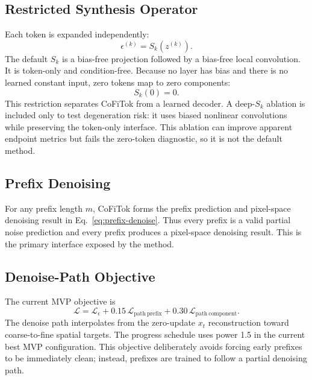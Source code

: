 \documentclass[letterpaper]{article}
\newcommand{\method}{CoFiTok}
\begin{document}
\subsection{Restricted Synthesis Operator}

Each token is expanded independently:
\begin{equation}
  \epsilon^{(k)} = S_k\left(z^{(k)}\right).
\end{equation}
The default $S_k$ is a bias-free projection followed by a bias-free local
convolution. It is token-only and condition-free. Because no layer has bias and
there is no learned constant input, zero tokens map to zero components:
\begin{equation}
  S_k(0)=0.
\end{equation}
This restriction separates \method{} from a learned decoder. A deep-$S_k$
ablation is included only to test degeneration risk: it uses biased nonlinear
convolutions while preserving the token-only interface. This ablation can
improve apparent endpoint metrics but fails the zero-token diagnostic, so it is
not the default method.

\subsection{Prefix Denoising}

For any prefix length $m$, \method{} forms the prefix prediction and pixel-space
denoising result in Eq.~\ref{eq:prefix-denoise}. Thus every prefix is a valid
partial noise prediction and every prefix produces a pixel-space denoising
result. This is the primary interface exposed by the method.

\subsection{Denoise-Path Objective}

The current MVP objective is
\begin{equation}
  \mathcal{L}
  =
  \mathcal{L}_{\epsilon}
  + 0.15\,\mathcal{L}_{\mathrm{path\ prefix}}
  + 0.30\,\mathcal{L}_{\mathrm{path\ component}}.
\end{equation}
The denoise path interpolates from the zero-update $x_t$ reconstruction toward
coarse-to-fine spatial targets. The progress schedule uses power 1.5 in the
current best MVP configuration. This objective deliberately avoids forcing early
prefixes to be immediately clean; instead, prefixes are trained to follow a
partial denoising path.
\end{document}

